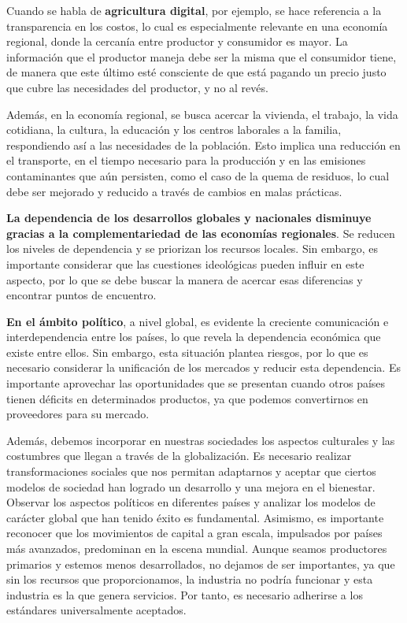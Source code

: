 \documentclass[
  letterpaper,
  DIV=11,
  numbers=noendperiod]{scrartcl}
\begin{document}
Cuando se habla de \textbf{agricultura digital}, por ejemplo, se hace
referencia a la transparencia en los costos, lo cual es especialmente
relevante en una economía regional, donde la cercanía entre productor y
consumidor es mayor. La información que el productor maneja debe ser la
misma que el consumidor tiene, de manera que este último esté consciente
de que está pagando un precio justo que cubre las necesidades del
productor, y no al revés.

Además, en la economía regional, se busca acercar la vivienda, el
trabajo, la vida cotidiana, la cultura, la educación y los centros
laborales a la familia, respondiendo así a las necesidades de la
población. Esto implica una reducción en el transporte, en el tiempo
necesario para la producción y en las emisiones contaminantes que aún
persisten, como el caso de la quema de residuos, lo cual debe ser
mejorado y reducido a través de cambios en malas prácticas.

\textbf{La dependencia de los desarrollos globales y nacionales
disminuye gracias a la complementariedad de las economías regionales}.
Se reducen los niveles de dependencia y se priorizan los recursos
locales. Sin embargo, es importante considerar que las cuestiones
ideológicas pueden influir en este aspecto, por lo que se debe buscar la
manera de acercar esas diferencias y encontrar puntos de encuentro.

\textbf{En el ámbito político}, a nivel global, es evidente la creciente
comunicación e interdependencia entre los países, lo que revela la
dependencia económica que existe entre ellos. Sin embargo, esta
situación plantea riesgos, por lo que es necesario considerar la
unificación de los mercados y reducir esta dependencia. Es importante
aprovechar las oportunidades que se presentan cuando otros países tienen
déficits en determinados productos, ya que podemos convertirnos en
proveedores para su mercado.

Además, debemos incorporar en nuestras sociedades los aspectos
culturales y las costumbres que llegan a través de la globalización. Es
necesario realizar transformaciones sociales que nos permitan adaptarnos
y aceptar que ciertos modelos de sociedad han logrado un desarrollo y
una mejora en el bienestar. Observar los aspectos políticos en
diferentes países y analizar los modelos de carácter global que han
tenido éxito es fundamental. Asimismo, es importante reconocer que los
movimientos de capital a gran escala, impulsados por países más
avanzados, predominan en la escena mundial. Aunque seamos productores
primarios y estemos menos desarrollados, no dejamos de ser importantes,
ya que sin los recursos que proporcionamos, la industria no podría
funcionar y esta industria es la que genera servicios. Por tanto, es
necesario adherirse a los estándares universalmente aceptados.
\end{document}
